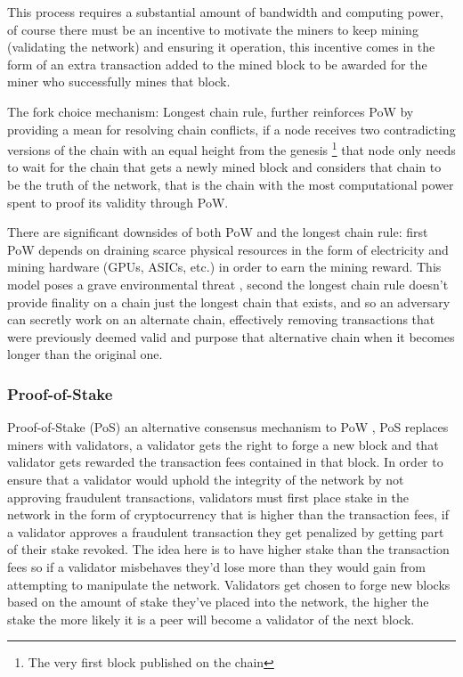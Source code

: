 \documentclass[12pt,twocolumn]{article}
\begin{document}
This process requires a substantial amount of bandwidth and computing power, of course there must be 
an incentive to motivate the miners to keep mining (validating the network) and ensuring it operation, 
this incentive comes in the form of an extra transaction added to the mined block to be awarded for the
miner who successfully mines that block.

The fork choice mechanism: Longest chain rule, further reinforces PoW by providing a mean for resolving chain conflicts, if a node receives two contradicting versions of the chain with an equal
height from the genesis \footnote{The very first block published on the chain} that node only needs to wait for the chain that gets a newly mined block and considers
that chain to be the truth of the network, that is the chain with the most computational power spent to proof its validity through PoW.

There are significant downsides of both PoW and the longest chain rule: first PoW depends on draining scarce physical resources
in the form of electricity and mining hardware (GPUs, ASICs, etc.) in order to earn the mining reward. This model poses a grave
environmental threat \cite{btc:waste}, second the longest chain rule doesn't provide finality on a chain just the longest chain that exists,
and so an adversary can secretly work on an alternate chain, effectively removing transactions that were previously deemed valid and purpose
that alternative chain when it becomes longer than the original one.

\subsubsection{Proof-of-Stake}
Proof-of-Stake (PoS) an alternative consensus mechanism to PoW \cite{pos}, 
PoS replaces miners with validators, a validator gets the right to forge a new block
and that validator gets rewarded the transaction fees contained in that block.
In order to ensure that a validator would uphold the integrity of the network by not
approving fraudulent transactions, validators must first place stake in the network in 
the form of cryptocurrency that is higher than the transaction fees, if a validator approves
a fraudulent transaction they get penalized by getting part of their stake revoked.
The idea here is to have higher stake than the transaction fees so if a validator misbehaves
they'd lose more than they would gain from attempting to manipulate the network.
Validators get chosen to forge new blocks based on the amount of stake they've placed into
the network, the higher the stake the more likely it is a peer will become a validator of the next block.
\end{document}
